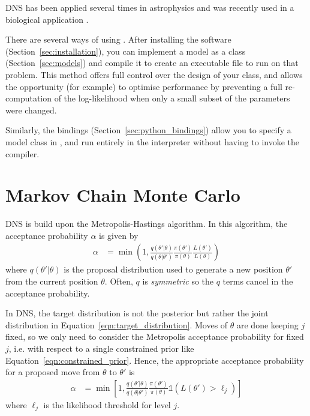 \documentclass[article]{jss}
\newcommand{\params}{\theta}
\begin{document}
DNS has been applied several times in astrophysics
\citep[e.g.][]{2014MNRAS.445.3055P, 2015ApJ...810...66H, 2015MNRAS.448.3206B}
and was recently used in a biological application \citep{salmonella}.

There are several ways of using . After installing the software
(Section~\ref{sec:installation}), you can implement a model as
a  class
(Section~\ref{sec:models}) and compile it to create an executable file
to run  on that problem. This method offers full control over the
design of your class, and allows the opportunity (for example) to optimise
performance by preventing a full re-computation of the log-likelihood when
only a small subset of the parameters were changed.

Similarly, the 
bindings (Section~\ref{sec:python_bindings}) allow you
to specify a model class in , and run  entirely
in the  interpreter without having to invoke the 
compiler.

\section{Markov Chain Monte Carlo}\label{sec:mcmc}
DNS is build upon the Metropolis-Hastings algorithm.
In this algorithm, the acceptance probability $\alpha$
is given by
\begin{align}
\alpha &= \min\left(1,
\frac{q(\params'|\params)}{q(\params | \params')}
\frac{\pi(\params')}{\pi(\params)}\frac{L(\params')}{L(\params)}
\right)
\end{align}
where $q(\theta' | \theta)$ is the proposal distribution used to generate
a new position $\theta'$ from the current position $\theta$. Often,
$q$ is {\em symmetric} so the $q$ terms cancel in the acceptance probability.

In DNS, the target distribution is not the posterior but rather
the joint distribution in Equation~\ref{eqn:target_distribution}.
Moves of $\theta$ are done keeping $j$ fixed, so we only need
to consider the Metropolis acceptance probability for fixed $j$,
i.e. with respect to a single constrained prior like
Equation~\ref{eqn:constrained_prior}.
Hence, the appropriate acceptance probability
for a proposed move from $\theta$ to $\theta'$ is
\begin{align}
\alpha &= \min\left[1,
\frac{q(\params'|\params)}{q(\params | \params')}
\frac{\pi(\params')}{\pi(\params)}
\mathds{1}\left(L(\params') > \ell_j\right)
\right]
\label{eqn:log_hastings}
\end{align}
where $\ell_j$ is the likelihood threshold for level $j$.
\end{document}
